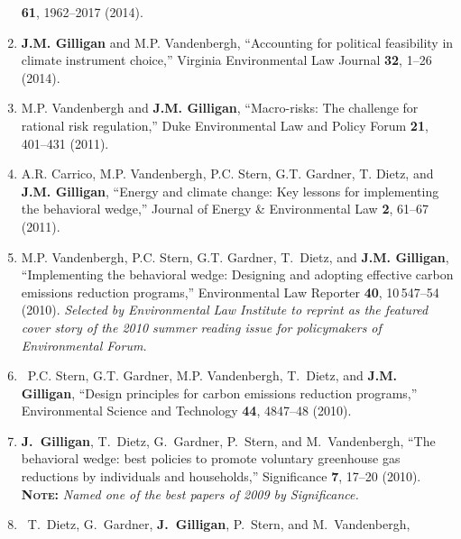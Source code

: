 \begin{enumerate}
    \textbf{61}, 1962--2017 (2014).
%
    \item 
    \textbf{J.M. Gilligan} and M.P. Vandenbergh, 
    \enquote{Accounting for political feasibility in climate instrument choice,}  
    Virginia Environmental Law Journal
    \textbf{32}, 1--26 (2014).
%
    \item
    M.P. Vandenbergh and \textbf{J.M. Gilligan}, 
    \enquote{Macro-risks: The challenge for rational risk regulation,}  
    Duke Environmental Law and Policy Forum
    \textbf{21}, 401--431 (2011). 
%	
    \item
    A.R. Carrico, M.P. Vandenbergh, P.C. Stern, G.T. Gardner, T. Dietz, and \textbf{J.M. Gilligan}, 
    \enquote{Energy and climate change: Key lessons for implementing the behavioral wedge,}  
    Journal of Energy \& Environmental Law \textbf{2}, 61--67 (2011). 
%	
\iffalse
    \item
    M.P. Vandenbergh, P.C. Stern, G.T. Gardner, T.~Dietz, and \textbf{J.M. Gilligan}, 
    \enquote{Implementing the behavioral wedge,}  
    Environmental Forum \textbf{28}, 54--63 (Jul/Aug~2011).\ 
    \textbf{\scshape Note:} \emph{Reprint of Vandenbergh et al., Environ. L. Rep.\ \textbf{40}, 10\,547 (2010) as featured cover story for summmer reading issue.}  
\fi
%	
    \item
    M.P. Vandenbergh, P.C. Stern, G.T. Gardner, T.~Dietz, and \textbf{J.M. Gilligan}, 
    \enquote{Implementing the behavioral wedge: Designing and adopting effective carbon emissions reduction programs,}  
    Environmental Law Reporter
    \textbf{40}, 10\,547--54 (2010).  
    \emph{Selected by Environmental Law Institute to reprint as the featured cover story of the 2010 summer reading issue for policymakers of Environmental Forum.}
%	
    \item
    \textdagger\
    P.C. Stern, G.T. Gardner, M.P. Vandenbergh, T.~Dietz, and \textbf{J.M. Gilligan},
    \enquote{Design principles for carbon emissions reduction programs,}  
    Environmental Science and Technology \textbf{44}, 4847--48 (2010).  
%	
	\item
    \textbf{J.~Gilligan}, T.~Dietz, G.~Gardner, P.~Stern, and M.~Vandenbergh, 
	\enquote{The behavioral wedge: best policies to promote voluntary greenhouse gas reductions by individuals and households,}  
      Significance \textbf{7}, 17--20 (2010). 
      {\bfseries\scshape Note:} \emph{Named one of the best papers of 2009 by Significance.}  
%	
    \item
    \textdagger\ 
    T.~Dietz, G.~Gardner, \textbf{J.~Gilligan}, P.~Stern, and M.~Vandenbergh, 

\end{enumerate}
